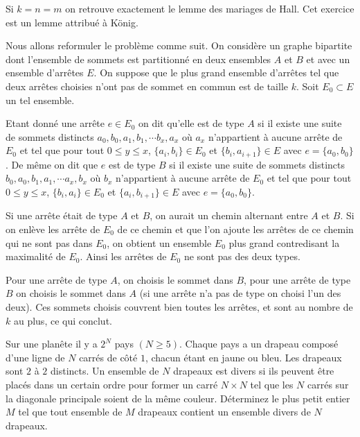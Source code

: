 \begin{sol}
Si $k=n=m$ on retrouve exactement le lemme des mariages de Hall. Cet exercice est un lemme attribué à König.

\medskip

Nous allons reformuler le problème comme suit. On considère un graphe bipartite dont l'ensemble de sommets est partitionné en deux ensembles $A$ et $B$ et avec un ensemble d'arrêtes $E$. On suppose que le plus grand ensemble d'arrêtes tel que deux arrêtes choisies n'ont pas de sommet en commun est de taille $k$. Soit $E_0\subset E$ un tel ensemble.

\medskip

 Etant donné une arrête $e\in E_0$ on dit qu'elle est de type $A$ si il existe une suite de sommets distincts $a_0, b_0,a_1,b_1,\cdots b_x,a_x$ où $a_x$ n'appartient à aucune arrête de $E_0$ et tel que pour tout $0\leq y\leq x$, $\{a_i,b_i\}\in E_0$ et $\{b_i,a_{i+1}\}\in E$ avec $e=\{a_0,b_0\}$. 
 De même on dit que $e$ est de type $B$ si il existe une suite de sommets distincts $b_0, a_0,b_1,a_1,\cdots a_x,b_x$ où $b_x$ n'appartient à aucune arrête de $E_0$ et tel que pour tout $0\leq y\leq x$, $\{b_i,a_i\}\in E_0$ et $\{a_i,b_{i+1}\}\in E$ avec $e=\{a_0,b_0\}$.
 
 \medskip
 
 Si une arrête était de type $A$ et $B$, on aurait un chemin alternant entre $A$ et $B$. Si on enlève les arrête de $E_0$ de ce chemin et que l'on ajoute les arrêtes de ce chemin qui ne sont pas dans $E_0$, on obtient un ensemble $E_0$ plus grand contredisant la maximalité de $E_0$. Ainsi les arrêtes de $E_0$ ne sont pas des deux types.
 
 \medskip
 
 Pour une arrête de type $A$, on choisis le sommet dans $B$, pour une arrête de type $B$ on choisis le sommet dans $A$ (si une arrête n'a pas de type on choisi l'un des deux). Ces sommets choisis couvrent bien toutes les arrêtes, et sont au nombre de $k$ au plus, ce qui conclut.

\end{sol}

\begin{exo}%

Sur une planête il y a $2^N$ pays $(N \geq 5).$ Chaque pays a un drapeau composé d'une ligne de $N$  carrés de côté $1$, chacun étant en jaune ou bleu. Les drapeaux sont $2$ à $2$ distincts. Un ensemble de $N$ drapeaux est divers si ils peuvent être placés dans un certain ordre pour former un carré $N \times N$ tel que les $N$ carrés sur la diagonale principale soient de la même couleur. Déterminez le plus petit entier $M$ tel que tout ensemble de $M$ drapeaux contient un ensemble divers de $N$ drapeaux.
\end{exo}


